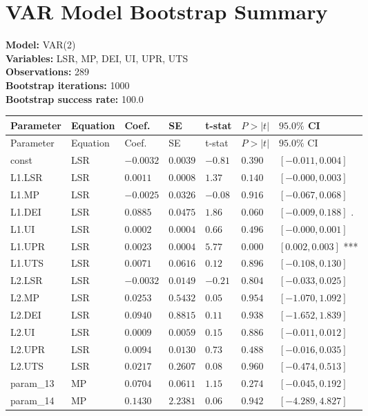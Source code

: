 \documentclass{article}
\begin{document}
\section*{VAR Model Bootstrap Summary}
\textbf{Model:} VAR(2)\\
\textbf{Variables:} LSR, MP, DEI, UI, UPR, UTS\\
\textbf{Observations:} 289\\
\textbf{Bootstrap iterations:} 1000\\
\textbf{Bootstrap success rate:} 100.0%
\bigskip
\begin{longtable}{lllllll}
\toprule
Parameter & Equation & Coef. & SE & t-stat & $P{>}|t|$ & $95.0\%$ CI \\
\midrule
\endfirsthead
\toprule
Parameter & Equation & Coef. & SE & t-stat & $P{>}|t|$ & $95.0\%$ CI \\
\midrule
\endhead
const & LSR & $-0.0032$ & $0.0039$ & $-0.81$ & $0.390$ & $[-0.011, 0.004]$  \\
L1.LSR & LSR & $0.0011$ & $0.0008$ & $1.37$ & $0.140$ & $[-0.000, 0.003]$  \\
L1.MP & LSR & $-0.0025$ & $0.0326$ & $-0.08$ & $0.916$ & $[-0.067, 0.068]$  \\
L1.DEI & LSR & $0.0885$ & $0.0475$ & $1.86$ & $0.060$ & $[-0.009, 0.188]$ . \\
L1.UI & LSR & $0.0002$ & $0.0004$ & $0.66$ & $0.496$ & $[-0.000, 0.001]$  \\
L1.UPR & LSR & $0.0023$ & $0.0004$ & $5.77$ & $0.000$ & $[0.002, 0.003]$ *** \\
L1.UTS & LSR & $0.0071$ & $0.0616$ & $0.12$ & $0.896$ & $[-0.108, 0.130]$  \\
L2.LSR & LSR & $-0.0032$ & $0.0149$ & $-0.21$ & $0.804$ & $[-0.033, 0.025]$  \\
L2.MP & LSR & $0.0253$ & $0.5432$ & $0.05$ & $0.954$ & $[-1.070, 1.092]$  \\
L2.DEI & LSR & $0.0940$ & $0.8815$ & $0.11$ & $0.938$ & $[-1.652, 1.839]$  \\
L2.UI & LSR & $0.0009$ & $0.0059$ & $0.15$ & $0.886$ & $[-0.011, 0.012]$  \\
L2.UPR & LSR & $0.0094$ & $0.0130$ & $0.73$ & $0.488$ & $[-0.016, 0.035]$  \\
L2.UTS & LSR & $0.0217$ & $0.2607$ & $0.08$ & $0.960$ & $[-0.474, 0.513]$  \\
param\_13 & MP & $0.0704$ & $0.0611$ & $1.15$ & $0.274$ & $[-0.045, 0.192]$  \\
param\_14 & MP & $0.1430$ & $2.2381$ & $0.06$ & $0.942$ & $[-4.289, 4.827]$  \\

\end{longtable}
\end{document}
